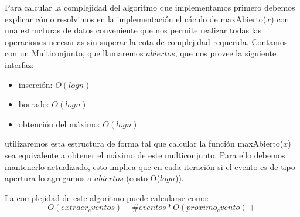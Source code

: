 Para calcular la complejidad del algoritmo que implementamos primero debemos
explicar cómo resolvimos en la implementación el cáculo de maxAbierto($x$) con
una estructuras de datos conveniente que nos permite realizar todas las
operaciones necesarias sin superar la cota de complejidad requerida.
Contamos con un Multiconjunto, que llamaremos $abiertos$, que nos provee la
siguiente interfaz:
\begin{itemize}
	\item inserción: $O(log n)$
	\item borrado: $O(log n)$
	\item obtención del máximo: $O(log n)$
\end{itemize}
utilizaremos esta estructura de forma tal que calcular la función maxAbierto($x$)
sea equivalente a obtener el máximo de este multiconjunto. Para ello debemos
mantenerlo actualizado, esto implica que en cada iteración si el evento es de tipo
apertura lo agregamos a $abiertos$ (costo O($log n$)). 

La complejidad de este algoritmo puede calcularse como:
\begin{displaymath}
	O(extraer_eventos) + \#eventos * O(proximo_evento) + 
\end{displaymath}
